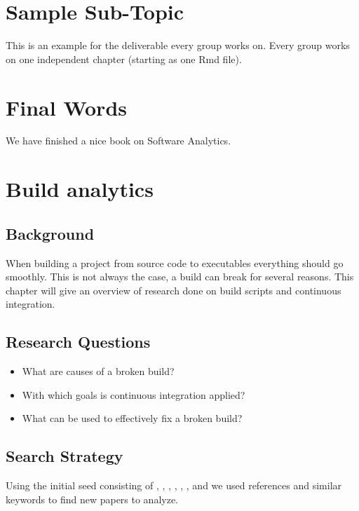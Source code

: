 \documentclass[]{book}
\providecommand{\tightlist}{%
  \setlength{\itemsep}{0pt}\setlength{\parskip}{0pt}}
\begin{document}
\chapter{Sample Sub-Topic}\label{sample-sub-topic}

This is an example for the deliverable every group works on. Every group
works on one independent chapter (starting as one Rmd file).

\chapter{Final Words}\label{final-words}

We have finished a nice book on Software Analytics.

\chapter{Build analytics}\label{build-analytics}

\section{Background}\label{background}

When building a project from source code to executables everything
should go smoothly. This is not always the case, a build can break for
several reasons. This chapter will give an overview of research done on
build scripts and continuous integration.

\section{Research Questions}\label{research-questions}

\begin{itemize}
\tightlist
\item
  What are causes of a broken build?
\item
  With which goals is continuous integration applied?
\item
  What can be used to effectively fix a broken build?
\end{itemize}

\section{Search Strategy}\label{search-strategy}

Using the initial seed consisting of \citet{bird2017predicting},
\citet{beller2017oops}, \citet{rausch2017empirical},
\citet{beller2017travistorrent}, \citet{pinto2018work},
\citet{zhao2017impact}, \citet{widder2018m} and \citet{hilton2016usage}
we used references and similar keywords to find new papers to analyze.
\end{document}
